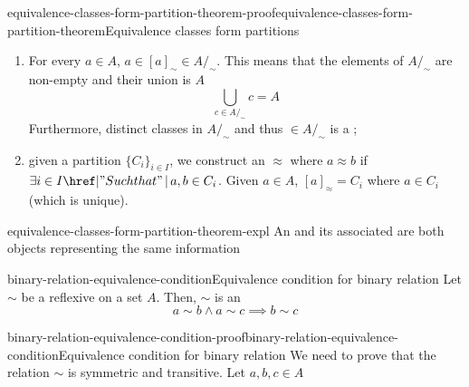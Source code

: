 \documentclass[preview]{standalone}
\begin{document}
\begin{snippetproof}{equivalence-classes-form-partition-theorem-proof}{equivalence-classes-form-partition-theorem}{Equivalence classes form partitions}
    \begin{enumerate}
        \item For every \(a\in A\), \(a \in {[a]}_\sim \in A/_\sim\). This means that the elements of \(A/_\sim\)
            are non-empty and their union is \(A\)
            \[ \bigcup_{c \in A/_\sim} c = A\]
            Furthermore, distinct classes in \(A/_\sim\)  and 
            thus \(\in A/_\sim\) is a \partition;
        \item given a partition \(\{C_i\}_{i\in I}\), we construct an \equivrelation \(\approx\) where
        \(a \approx b\) if \(\exists i\in I \suchthat a,b \in C_i \).
        Given \(a\in A\), \({[a]}_\approx = C_i\) where \(a \in C_i\) (which is unique).
    \end{enumerate}
\end{snippetproof}

\begin{snippet}{equivalence-classes-form-partition-theorem-expl}
    An \equivrelation and its associated \partition are both objects representing the same information
\end{snippet}

\begin{snippetproposition}{binary-relation-equivalence-condition}{Equivalence condition for binary relation}
    Let \(\sim\) be a reflexive \binrelation on a set \(A\).
    Then, \(\sim\) is an \equivrelation \ifandonlyif
    \[ a\sim b \land a \sim c \implies b \sim c \]
\end{snippetproposition}

\begin{snippetproof}{binary-relation-equivalence-condition-proof}{binary-relation-equivalence-condition}{Equivalence condition for binary relation}
    We need to prove that the relation \(\sim\) is symmetric and transitive.
    Let \(a,b,c\in A\) \\
\end{snippetproof}
\end{document}
